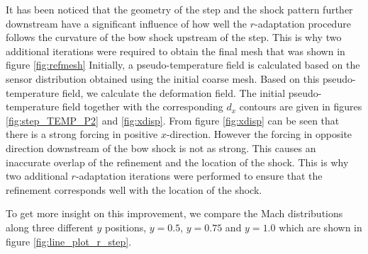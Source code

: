 \documentclass[review]{elsarticle}
\begin{document}
\par It has been noticed that the geometry of the step and the shock pattern further downstream have a significant influence of how well the $r$-adaptation procedure follows the curvature of the bow shock upstream of the step.
This is why two additional iterations were required to obtain the final mesh that was shown in figure \ref{fig:refmesh}
Initially, a pseudo-temperature field is calculated based on the sensor distribution obtained using the initial coarse mesh.
Based on this pseudo-temperature field, we calculate the deformation field.
The initial pseudo-temperature field together with the corresponding $d_x$ contours are given in figures \ref{fig:step_TEMP_P2} and \ref{fig:xdisp}.
From figure \ref{fig:xdisp} can be seen that there is a strong forcing in positive $x$-direction. However the forcing in opposite direction downstream of the bow shock is not as strong.
This causes an inaccurate overlap of the refinement and the location of the shock.
This is why two additional $r$-adaptation iterations were performed to ensure that the refinement corresponds well with the location of the shock.
\par To get more insight on this improvement, we compare the Mach distributions along three different $y$ positions, $y=0.5$, $y=0.75$ and $y=1.0$ which are shown in figure \ref{fig:line_plot_r_step}.
\end{document}
